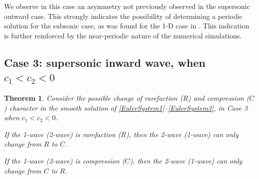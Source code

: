 \documentclass[11pt]{article}
\newtheorem{thm}{Theorem}[section]
\begin{document}
We observe in this case an asymmetry not previously observed in the supersonic outward case. This strongly indicates the possibility of determining a periodic solution for the subsonic case, as was found for the 1-D case in \cite{TY_Periodic}. This indication is further reinforced by the near-periodic nature of the numerical simulations.

\subsection{Case 3: supersonic inward wave, when $c_1<c_2<0$}

\begin{thm}
	Consider the possible change of rarefaction ($R$) and compression ($C$) character in the smooth solution of \eqref{EulerSystem1}--\eqref{EulerSystem3}, in Case 3 when $c_1<c_2<0$.
	
	If the 1-wave (2-wave) is rarefaction ($R$), then the 2-wave  (1-wave) can only change from $R$ to $C$.
	
	If the 1-wave (2-wave) is compression ($C$), then the 2-wave  (1-wave) can only change from $C$ to $R$.
	\label{Theorem:inward_wave}
\end{thm} 
\end{document}
